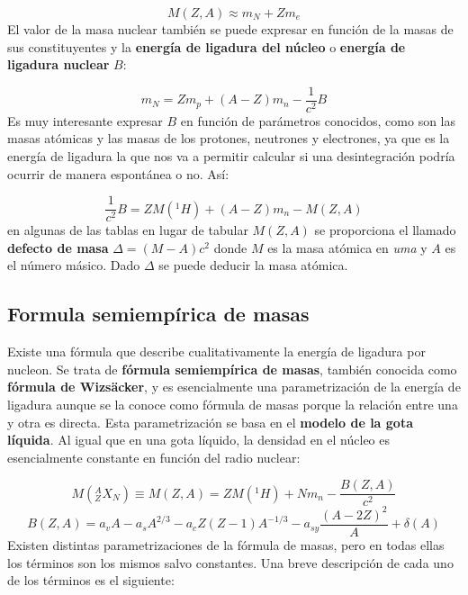\begin{equation}
	M(Z,A) \approx m_N + Zm_e
\end{equation}
El valor de la masa nuclear también se puede expresar en función de la masas de sus constituyentes y la \textbf{energía de ligadura del núcleo} o \textbf{energía de ligadura nuclear} $B$:

\begin{equation}
	m_N =Zm_p + (A-Z)m_n - \frac{1}{c^2} B
\end{equation}
Es muy interesante expresar $B$ en función de parámetros conocidos, como son las masas atómicas y las masas de los protones, neutrones y electrones, ya que es la energía de ligadura la que nos va a permitir calcular si una desintegración podría ocurrir de manera espontánea o no. Así:

\begin{equation}
	\frac{1}{c^2} B = ZM(^1H) + (A-Z)m_n - M(Z,A)
\end{equation}
en algunas de las tablas en lugar de tabular $M(Z,A)$ se proporciona el llamado \textbf{defecto de masa} $\Delta = (M-A)c^2$ donde $M$ es la masa atómica en \textit{uma} y $A$ es el número másico. Dado $\Delta$ se puede deducir la masa atómica.



\subsection{Formula semiempírica de masas}

Existe una fórmula que describe cualitativamente la energía de ligadura por nucleon. Se trata de \textbf{fórmula semiempírica de masas}, también conocida como \textbf{fórmula de Wizsäcker}, y es esencialmente una parametrización de la energía de ligadura aunque se la conoce como fórmula de masas porque la relación entre una y otra es directa. Esta parametrización se basa en el \textbf{modelo de la gota líquida}. Al igual que en una gota líquido, la densidad en el núcleo es esencialmente constante en función del radio nuclear:

\begin{equation}
	M(^A_ZX_N) \equiv M(Z,A) = ZM(^1 H) + Nm_n - \frac{B(Z,A)}{c^2}
\end{equation}
\begin{equation}
	B(Z,A) = a_v A - a_s A^{2/3} - a_c Z(Z-1) A^{-1/3} - a_{sy} \frac{(A-2Z)^2}{A} + \delta (A)
\end{equation}
Existen distintas parametrizaciones de la fórmula de masas, pero en todas ellas los términos son los mismos salvo constantes. Una breve descripción de cada uno de los términos es el siguiente:

